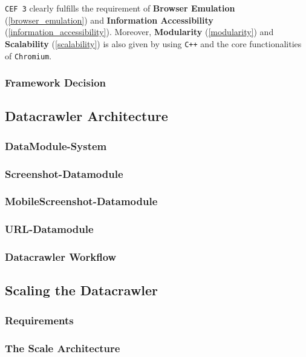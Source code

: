 \texttt{CEF 3} clearly fulfills the requirement of \textbf{Browser Emulation} (\ref{browser_emulation}) and \textbf{Information Accessibility} (\ref{information_accessibility}). Moreover, \textbf{Modularity} (\ref{modularity}) and \textbf{Scalability} (\ref{scalability}) is also given by using \texttt{C++} and the core functionalities of \texttt{Chromium}.

\subsubsection{Framework Decision}

\subsection{Datacrawler Architecture}
\label{datacrawler_architecture}

\subsubsection{DataModule-System}
\label{datacrawler_datamodulesystem}

\subsubsection{Screenshot-Datamodule}
\label{datacrawler_screenshot_datamodule}

\subsubsection{MobileScreenshot-Datamodule}
\label{datacrawler_mobilescreenshot_datamodule}

\subsubsection{URL-Datamodule}
\label{datacrawler_url_datamodule}


\subsubsection{Datacrawler Workflow}
\label{datacrawler_workflow}

\subsection{Scaling the Datacrawler}
\label{datacrawler_scale}

\subsubsection{Requirements}
\label{datacrawler_scale_requirements}

\subsubsection{The Scale Architecture}
\label{datacrawler_scale_architecture}


